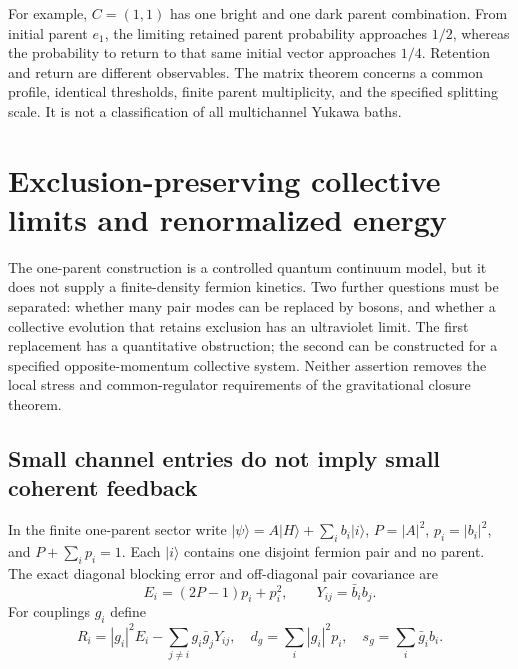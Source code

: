 \documentclass[11pt,a4paper,oneside]{book}
\theoremstyle{plain}
\theoremstyle{definition}
\theoremstyle{remark}
\begin{document}
For example, $C=(1,1)$ has one bright and one dark parent combination.
From initial parent $e_1$, the limiting retained parent probability
approaches $1/2$, whereas the probability to return to that same initial
vector approaches $1/4$.  Retention and return are different observables.
The matrix theorem concerns a common profile, identical thresholds,
finite parent multiplicity, and the specified splitting scale.  It is
not a classification of all multichannel Yukawa baths.


\chapter{Exclusion-preserving collective limits and renormalized energy}
\label{ch:collective-limits}
The one-parent construction is a controlled quantum continuum model,
but it does not supply a finite-density fermion kinetics.  Two further
questions must be separated: whether many pair modes can be replaced
by bosons, and whether a collective evolution that retains exclusion
has an ultraviolet limit.  The first replacement has a quantitative
obstruction; the second can be constructed for a specified
opposite-momentum collective system.  Neither assertion removes the
local stress and common-regulator requirements of the gravitational
closure theorem.

\section{Small channel entries do not imply small coherent feedback}
\label{sec:weighted-coherence}
In the finite one-parent sector write
$|\psi\rangle=A|H\rangle+\sum_i b_i|i\rangle$,
$P=|A|^2$, $p_i=|b_i|^2$, and $P+\sum_i p_i=1$.  Each $|i\rangle$
contains one disjoint fermion pair and no parent.  The exact diagonal
blocking error and off-diagonal pair covariance are
\begin{equation}
 E_i=(2P-1)p_i+p_i^2,\qquad Y_{ij}=\bar b_i b_j.
 \label{eq:one-parent-correlation-entries}
\end{equation}
For couplings $g_i$ define
\begin{equation}
 R_i=|g_i|^2E_i-\sum_{j\ne i}g_i\bar g_jY_{ij},\quad
 d_g=\sum_i|g_i|^2p_i,\quad s_g=\sum_i\bar g_i b_i.
 \label{eq:weighted-residual-definition}
\end{equation}
\end{document}
